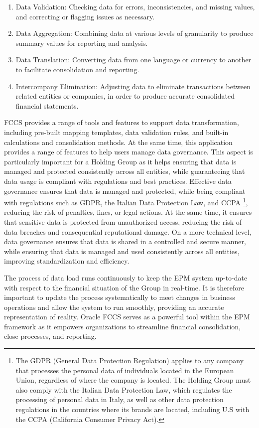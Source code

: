 \documentclass[12pt,a4paper,openright,twoside]{book}
\begin{document}
\begin{enumerate}
    \item Data Validation: Checking data for errors, inconsistencies, and missing values, and correcting or flagging issues as necessary.
    \item Data Aggregation:  Combining data at various levels of granularity to produce summary values for reporting and analysis.
    \item Data Translation: Converting data from one language or currency to another to facilitate consolidation and reporting.
    \item Intercompany Elimination: Adjusting data to eliminate transactions between related entities or companies, in order to produce accurate consolidated financial statements.
\end{enumerate}

FCCS provides a range of tools and features to support data transformation, including pre-built mapping templates, data validation rules, and built-in calculations and consolidation methods. 
%
At the same time, this application provides a range of features to help users manage data governance.
%
This aspect is particularly important for a Holding Group as it helps ensuring that data is managed and protected consistently across all entities, while guaranteeing that data usage is compliant with regulations and best practices.
%
Effective data governance ensures that data is managed and protected, while being compliant with regulations such as GDPR, the Italian Data Protection Law, and CCPA \footnote{The GDPR (General Data Protection Regulation) applies to any company that processes the personal data of individuals located in the European Union, regardless of where the company is located. The Holding Group must also comply with the Italian Data Protection Law, which regulates the processing of personal data in Italy, as well as other data protection regulations in the countries where its brands are located, including U.S with the CCPA (California Consumer Privacy Act).}, reducing the risk of penalties, fines, or legal actions.
%
At the same time, it ensures that sensitive data is protected from unauthorized access,  reducing the risk of data breaches and consequential reputational damage.
%
On a more technical level, data governance ensures that data is shared in a controlled and secure manner, while ensuring that data is managed and used consistently across all entities, improving standardization and efficiency.

The process of data load runs continuously to keep the EPM system up-to-date with respect to the financial situation of the Group in real-time.
%
It is therefore important to update the process systematically to meet changes in business operations and allow the system to run smoothly, providing an accurate representation of reality.
%
Oracle FCCS serves as a powerful tool within the EPM framework as it empowers organizations to streamline financial consolidation, close processes, and reporting. 
\end{document}
